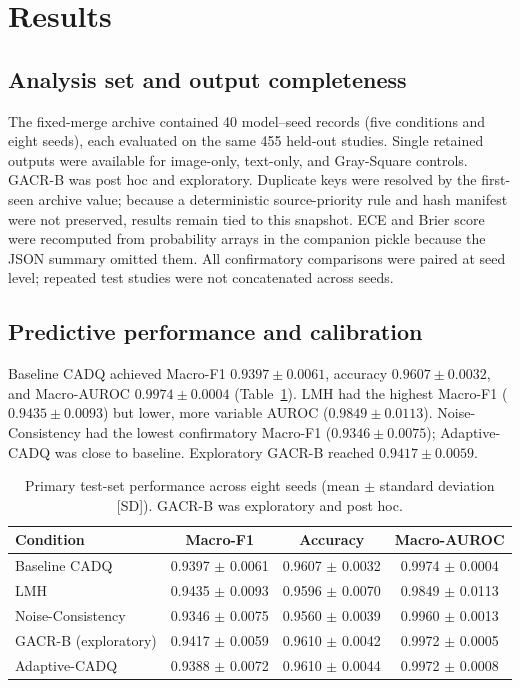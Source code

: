 
\section{Results}\label{sec:results}

\subsection{Analysis set and output completeness}\label{sec:results-completeness}
The fixed-merge archive contained 40 model--seed records (five conditions and
eight seeds), each evaluated on the same 455 held-out studies. Single retained
outputs were available for image-only, text-only, and Gray-Square controls.
GACR-B was post hoc and exploratory. Duplicate keys were resolved by the
first-seen archive value; because a deterministic source-priority rule and hash
manifest were not preserved, results remain tied to this snapshot. ECE and
Brier score were recomputed from probability arrays in the companion pickle
because the JSON summary omitted them. All confirmatory comparisons were paired
at seed level; repeated test studies were not concatenated across seeds.

\subsection{Predictive performance and calibration}\label{sec:results-primary}
Baseline CADQ achieved Macro-F1 $0.9397\pm0.0061$, accuracy
$0.9607\pm0.0032$, and Macro-AUROC $0.9974\pm0.0004$ (Table~\ref{tab:primary-performance}).
LMH had the highest Macro-F1 ($0.9435\pm0.0093$) but lower, more variable
AUROC ($0.9849\pm0.0113$). Noise-Consistency had the lowest confirmatory
Macro-F1 ($0.9346\pm0.0075$); Adaptive-CADQ was close to baseline. Exploratory
GACR-B reached $0.9417\pm0.0059$.

\begin{table}[pos=htbp]
\centering
\caption{Primary test-set performance across eight seeds (mean $\pm$ standard
deviation [SD]).
GACR-B was exploratory and post hoc.}
\label{tab:primary-performance}
\small
\begin{tabular}{lccc}
\toprule
Condition & Macro-F1 & Accuracy & Macro-AUROC\\
\midrule
Baseline CADQ       & 0.9397 $\pm$ 0.0061 & 0.9607 $\pm$ 0.0032 & 0.9974 $\pm$ 0.0004\\
LMH                 & 0.9435 $\pm$ 0.0093 & 0.9596 $\pm$ 0.0070 & 0.9849 $\pm$ 0.0113\\
Noise-Consistency   & 0.9346 $\pm$ 0.0075 & 0.9560 $\pm$ 0.0039 & 0.9960 $\pm$ 0.0013\\
GACR-B (exploratory)& 0.9417 $\pm$ 0.0059 & 0.9610 $\pm$ 0.0042 & 0.9972 $\pm$ 0.0005\\
Adaptive-CADQ      & 0.9388 $\pm$ 0.0072 & 0.9610 $\pm$ 0.0044 & 0.9972 $\pm$ 0.0008\\
\bottomrule
\end{tabular}
\end{table}

